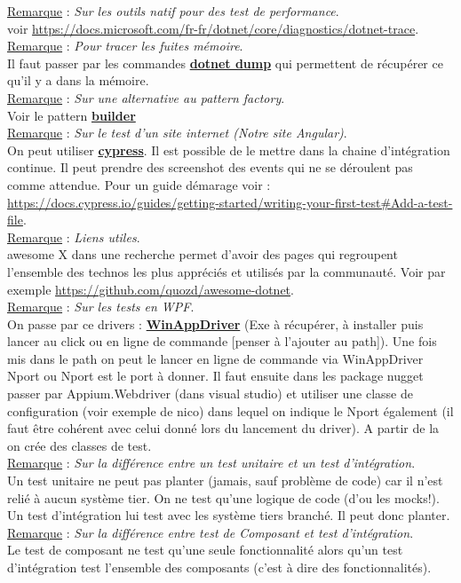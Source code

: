 \documentclass[a4paper,12pt,twoside]{article}
\newcommand{\urlcolor}{magenta}  %
\newcommand{\keycolor}{purple} %
\newcommand{\rem}[2]{\noindent\underline{Remarque} : \textit{#1}.\\ \indent #2}
\newcommand{\keyref}[2]{\hypersetup{urlcolor=\keycolor} \href{#1}{\textbf{#2}}\hypersetup{urlcolor=\urlcolor}}
\begin{document}
\rem{Sur les outils natif pour des test de performance}{voir \url{https://docs.microsoft.com/fr-fr/dotnet/core/diagnostics/dotnet-trace}.}\\

\rem{Pour tracer les fuites mémoire}{Il faut passer par les commandes \keyref{https://docs.microsoft.com/fr-fr/dotnet/core/diagnostics/dotnet-dump}{dotnet dump} qui permettent de récupérer ce qu'il y a dans la mémoire.}\\

\rem{Sur une alternative au pattern factory}{Voir le pattern \keyref{https://refactoring.guru/design-patterns/builder}{builder}}\\

\rem{Sur le test d'un site internet (Notre site Angular)}{On peut utiliser \keyref{https://github.com/cypress-io/cypress}{cypress}. Il est possible de le mettre dans la chaine d'intégration continue. Il peut prendre des screenshot des events qui ne se déroulent pas comme attendue. Pour un guide démarage voir : \url{https://docs.cypress.io/guides/getting-started/writing-your-first-test\#Add-a-test-file}.}\\

\rem{Liens utiles}{awesome X dans une recherche permet d'avoir des pages qui regroupent l'ensemble des technos les plus appréciés et utilisés par la communauté. Voir par exemple \url{https://github.com/quozd/awesome-dotnet}.}\\

\rem{Sur les tests en WPF}{On passe par ce drivers : \keyref{https://github.com/microsoft/WinAppDriver}{WinAppDriver} (Exe à récupérer, à installer puis lancer au click ou en ligne de commande [penser à l'ajouter au path]). Une fois mis dans le path on peut le lancer en ligne de commande via WinAppDriver Nport ou Nport est le port à donner. Il faut ensuite dans les package nugget passer par Appium.Webdriver (dans visual studio) et utiliser une classe de configuration (voir exemple de nico) dans lequel on indique le Nport également (il faut être cohérent avec celui donné lors du lancement du driver). A partir de la on crée des classes de test.}\\

\rem{Sur la différence entre un test unitaire et un test d'intégration}{Un test unitaire ne peut pas planter (jamais, sauf problème de code) car il n'est relié à aucun système tier. On ne test qu'une logique de code (d'ou les mocks!). Un test d'intégration lui test avec les système tiers branché. Il peut donc planter.}\\

\rem{Sur la différence entre test de Composant et test d'intégration}{Le test de composant ne test qu'une seule fonctionnalité alors qu'un test d'intégration test l'ensemble des composants (c'est à dire des fonctionnalités).}\\

\end{document}
